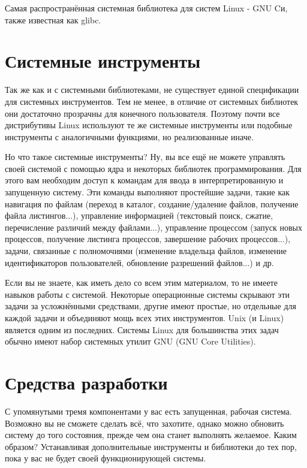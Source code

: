 \documentclass[12pt]{book}
\begin{document}
Самая распространённая системная библиотека для систем Linux - GNU Cи, также известная как glibc.

\section{Системные инструменты}

Так же как и с системными библиотеками, не существует единой спецификации для системных инструментов. Тем не менее, в отличие от системных библиотек они достаточно прозрачны для конечного пользователя. Поэтому почти все дистрибутивы Linux используют те же системные инструменты или подобные инструменты с  аналогичными функциями, но реализованные иначе.

Но что такое системные инструменты? Ну, вы все ещё не можете управлять своей системой с помощью ядра и некоторых библиотек программирования. Для этого вам необходим доступ к командам для ввода в интерпретированную и запущенную систему. Эти команды выполняют простейшие задачи, такие как навигация по файлам (переход в каталог, создание/удаление файлов, получение файла листингов...), управление информацией (текстовый поиск, сжатие, перечисление различий между файлами...), управление процессом (запуск  новых процессов, получение листинга процессов, завершение рабочих процессов...), задачи, связанные с полномочиями (изменение владельца файлов, изменение идентификаторов пользователей, обновление разрешений файлов...) и др.

Если вы не знаете, как иметь дело со всем этим материалом, то не имеете навыков работы с системой. Некоторые операционные системы скрывают эти задачи за усложнёнными средствами, другие имеют простые, но отдельные для каждой задачи и объединяют мощь всех этих инструментов. Unix (и Linux) является одним из последних. Системы Linux для большинства этих задач обычно имеют набор системных утилит GNU (GNU Core Utilities).

\section{Средства разработки}

С упомянутыми тремя компонентами у вас есть запущенная, рабочая  система. Возможно вы не сможете сделать всё, что захотите, однако можно обновить систему до того состояния, прежде чем она станет выполнять желаемое. Каким образом? Устанавливая дополнительные инструменты и библиотеки до тех пор, пока у вас не будет своей функционирующей системы.
\end{document}
